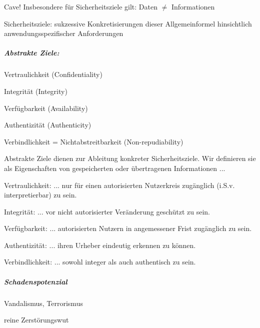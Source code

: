 \documentclass[a4paper]{article}
\begin{document}
\begin{multicols}{3}
    Cave! Insbesondere für Sicherheitsziele gilt: Daten
    $\not=$ Informationen

    Sicherheitsziele: sukzessive Konkretisierungen dieser Allgemeinformel
    hinsichtlich anwendungsspezifischer Anforderungen


    \subparagraph{Abstrakte Ziele:}

    \begin{enumerate*}
        \item
        Vertraulichkeit (Confidentiality)
        \item
        Integrität (Integrity)
        \item
        Verfügbarkeit (Availability)
        \item
        Authentizität (Authenticity)
        \item
        Verbindlichkeit = Nichtabstreitbarkeit (Non-repudiability)
    \end{enumerate*}

    Abstrakte Ziele dienen zur Ableitung konkreter Sicherheitsziele. Wir
    definieren sie als Eigenschaften von gespeicherten oder übertragenen
    Informationen ...

    \begin{itemize*}
        \item
        Vertraulichkeit: ... nur für einen autorisierten Nutzerkreis
        zugänglich (i.S.v. interpretierbar) zu sein.
        \item
        Integrität: ... vor nicht autorisierter Veränderung geschützt zu sein.
        \item
        Verfügbarkeit: ... autorisierten Nutzern in angemessener Frist
        zugänglich zu sein.
        \item
        Authentizität: ... ihren Urheber eindeutig erkennen zu können.
        \item
        Verbindlichkeit: ... sowohl integer als auch authentisch zu sein.
    \end{itemize*}


    \subparagraph{Schadenspotenzial}

    \begin{enumerate*}
        \item
        Vandalismus, Terrorismus
    \end{enumerate*}

    \begin{itemize*}
        \item
        reine Zerstörungswut
    \end{itemize*}


\end{multicols}
\end{document}
